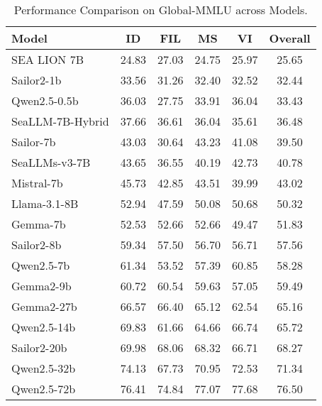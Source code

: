 \begin{table}[ht]
\centering
\caption{Performance Comparison on Global-MMLU across Models.}
\label{tab:global_mmlu_performance}
\begin{tabular}{lccccc}
\toprule
\multicolumn{1}{l}{\textbf{Model}} & \textbf{ID} & \textbf{FIL} & \textbf{MS} & \textbf{VI} & \textbf{Overall} \\ %
\midrule
SEA LION 7B & 24.83 & 27.03 & 24.75 & 25.97 & 25.65 \\ %
Sailor2-1b & 33.56 & 31.26 & 32.40 & 32.52 & 32.44 \\ %
Qwen2.5-0.5b & 36.03 & 27.75 & 33.91 & 36.04 & 33.43 \\ %
SeaLLM-7B-Hybrid & 37.66 & 36.61 & 36.04 & 35.61 & 36.48 \\ %
Sailor-7b & 43.03 & 30.64 & 43.23 & 41.08 & 39.50 \\ %
SeaLLMs-v3-7B & 43.65 & 36.55 & 40.19 & 42.73 & 40.78 \\ %
Mistral-7b & 45.73 & 42.85 & 43.51 & 39.99 & 43.02 \\ %
Llama-3.1-8B & 52.94 & 47.59 & 50.08 & 50.68 & 50.32 \\ %
Gemma-7b & 52.53 & 52.66 & 52.66 & 49.47 & 51.83 \\ %
Sailor2-8b & 59.34 & 57.50 & 56.70 & 56.71 & 57.56 \\ %
Qwen2.5-7b & 61.34 & 53.52 & 57.39 & 60.85 & 58.28 \\ %
Gemma2-9b & 60.72 & 60.54 & 59.63 & 57.05 & 59.49 \\ %
Gemma2-27b & 66.57 & 66.40 & 65.12 & 62.54 & 65.16 \\ %
Qwen2.5-14b & 69.83 & 61.66 & 64.66 & 66.74 & 65.72 \\ %
Sailor2-20b & 69.98 & 68.06 & 68.32 & 66.71 & 68.27 \\ %
Qwen2.5-32b & 74.13 & 67.73 & 70.95 & 72.53 & 71.34 \\ %
Qwen2.5-72b & 76.41 & 74.84 & 77.07 & 77.68 & 76.50 \\ %
\bottomrule
\end{tabular}
\end{table}


